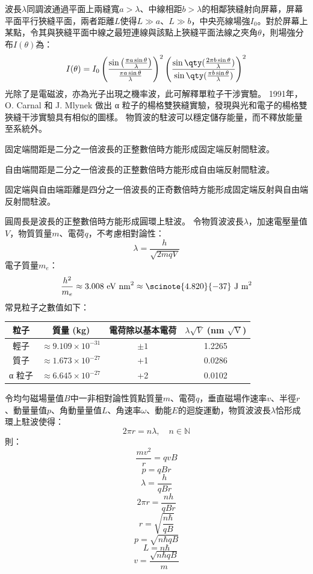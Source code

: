 \documentclass[a4paper,12pt]{article}
\begin{document}
波長$\lambda$同調波通過平面上兩縫寬$a>\lambda$、中線相距$b>\lambda$的相鄰狹縫射向屏幕，屏幕平面平行狹縫平面，兩者距離$L$使得$L\gg a$、$L\gg b$，中央亮線場強$I_0$。對於屏幕上某點，令其與狹縫平面中線之最短連線與該點上狹縫平面法線之夾角$\theta$，則場強分布$I(\theta)$為：
\[I(\theta) = I_0\left( \frac{\sin \left( \frac{\pi a \sin\theta}{\lambda} \right)}{\frac{\pi a \sin\theta}{\lambda}} \right)^2\left(\frac{\sin\qty(\frac{2\pi b\sin\theta}{\lambda})}{\sin\qty(\frac{\pi b\sin\theta}{\lambda})}\right)^2\]
光除了是電磁波，亦為光子出現之機率波，此可解釋單粒子干涉實驗。
1991年，O. Carnal 和 J. Mlynek 做出 α 粒子的楊格雙狹縫實驗，發現與光和電子的楊格雙狹縫干涉實驗具有相似的圖樣。
物質波的駐波可以穩定儲存能量，而不釋放能量至系統外。
\bit
\item 固定端間距是二分之一倍波長的正整數倍時方能形成固定端反射間駐波。
\item 自由端間距是二分之一倍波長的正整數倍時方能形成自由端反射間駐波。
\item 固定端與自由端距離是四分之一倍波長的正奇數倍時方能形成固定端反射與自由端反射間駐波。
\item 圓周長是波長的正整數倍時方能形成圓環上駐波。
\eit
{}
令物質波波長$\lambda$，加速電壓量值$V$，物質質量$m$、電荷$q$，不考慮相對論性：
\[\lambda=\frac{h}{\sqrt{2mqV}}\]
電子質量$m_e$：
\[\frac{h^2}{m_e}\approx3.008\text{\ eV\ nm}^2\approx\scinote{4.820}{-37}\text{\ J m}^2\]
常見粒子之數值如下：
\begin{longtable}[c]{|c|c|c|c|}
\hline
粒子 & 質量 (kg) & 電荷除以基本電荷 & $\lambda\sqrt{V}$ (nm $\sqrt{\text{V}}$)\\\hline\endhead
輕子 & \(\approx9.109 \times 10^{-31}\) & \(\pm1\) & 1.2265\\\hline
質子 & \(\approx1.673 \times 10^{-27}\) & +1 & 0.0286\\\hline
α 粒子 & \(\approx6.645 \times 10^{-27}\) & +2 & 0.0102\\\hline
\end{longtable}\FB
{}
令均勻磁場量值$B$中一非相對論性質點質量$m$、電荷$q$，垂直磁場作速率$v$、半徑$r$、動量量值$p$、角動量量值$L$、角速率$\omega$、動能$E$的迴旋運動，物質波波長$\lambda$恰形成環上駐波使得：
\[2\pi r=n\lambda,\quad n\in\mathbb{N}\]
則：
\[\frac{mv^2}{r}=qvB\]
\[p=qBr\]
\[\lambda=\frac{h}{qBr}\]
\[2\pi r=\frac{nh}{qBr}\]
\[r=\sqrt{\frac{n\hbar}{qB}}\]
\[p=\sqrt{n\hbar qB}\]
\[L=n\hbar\]
\[v=\frac{\sqrt{n\hbar qB}}{m}\]
\end{document}

